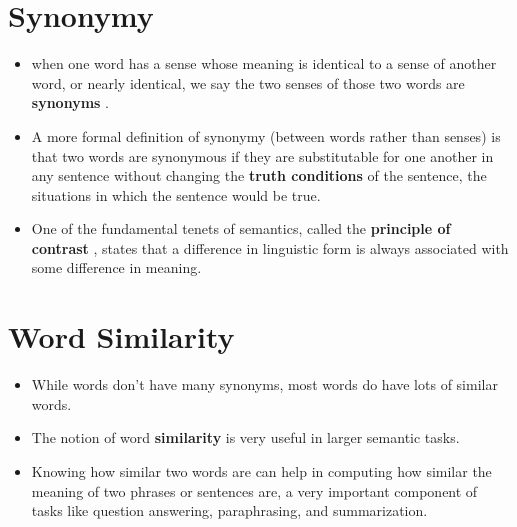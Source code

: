 \section{Synonymy \cite{nlp-1}}\label{Synonymy}
\begin{itemize}
    \item when one word has a sense whose meaning is identical to a sense of another word, or nearly identical, we say the two senses of those two words are \textbf{synonyms} .

    \item A more formal definition of synonymy (between words rather than senses) is that two words are synonymous if they are substitutable for one another in any sentence without changing the \textbf{truth conditions} of the sentence, the situations in which the sentence would be true.

    \item One of the fundamental tenets of semantics, called the \textbf{principle of contrast} , states that a difference in linguistic form is always associated with some difference in meaning.
\end{itemize}


\section{Word Similarity \cite{nlp-1}}\label{Word Similarity}
\begin{itemize}
    \item While words don’t have many synonyms, most words do have lots of similar words.
    
    \item The notion of word \textbf{similarity} is very useful in larger semantic tasks.

    \item Knowing how similar two words are can help in computing how similar the meaning of two phrases or sentences are, a very important component of tasks like question answering, paraphrasing, and summarization.

    
\end{itemize}


